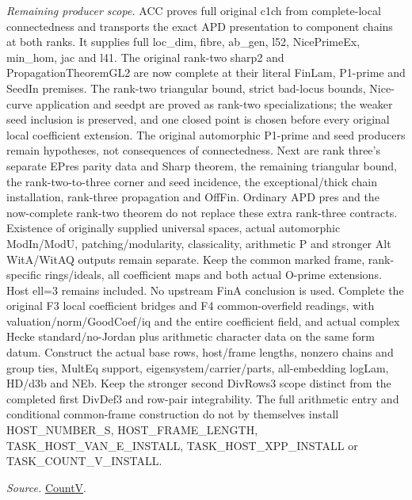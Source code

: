 \documentclass[11pt,a4paper]{article}
\numberwithin{equation}{section}
\theoremstyle{remark}\newtheorem{remark}[theorem]{Remark}
\begin{document}
\emph{Remaining producer scope.} ACC proves full original c1ch from complete-local connectedness and transports the exact APD presentation to component chains at both ranks. It supplies full loc\_\allowbreak dim, fibre, ab\_\allowbreak gen, l52, NicePrimeEx, min\_\allowbreak hom, jac and l41. The original rank-two sharp2 and PropagationTheoremGL2 are now complete at their literal FinLam, P1-prime and SeedIn premises. The rank-two triangular bound, strict bad-locus bounds, Nice-curve application and seedpt are proved as rank-two specializations; the weaker seed inclusion is preserved, and one closed point is chosen before every original local coefficient extension. The original automorphic P1-prime and seed producers remain hypotheses, not consequences of connectedness. Next are rank three's separate EPres parity data and Sharp theorem, the remaining triangular bound, the rank-two-to-three corner and seed incidence, the exceptional/thick chain installation, rank-three propagation and OffFin. Ordinary APD pres and the now-complete rank-two theorem do not replace these extra rank-three contracts. Existence of originally supplied universal spaces, actual automorphic ModIn/ModU, patching/modularity, classicality, arithmetic P and stronger Alt WitA/WitAQ outputs remain separate. Keep the common marked frame, rank-specific rings/ideals, all coefficient maps and both actual O-prime extensions. Host ell=3 remains included. No upstream FinA conclusion is used. Complete the original F3 local coefficient bridges and F4 common-overfield readings, with valuation/norm/GoodCoef/iq and the entire coefficient field, and actual complex Hecke standard/no-Jordan plus arithmetic character data on the same form datum. Construct the actual base rows, host/frame lengths, nonzero chains and group ties, MultEq support, eigensystem/carrier/parts, all-embedding logLam, HD/d3b and NEb. Keep the stronger second DivRows3 scope distinct from the completed first DivDef3 and row-pair integrability. The full arithmetic entry and conditional common-frame construction do not by themselves install HOST\_\allowbreak NUMBER\_\allowbreak S, HOST\_\allowbreak FRAME\_\allowbreak LENGTH, TASK\_\allowbreak HOST\_\allowbreak VAN\_\allowbreak E\_\allowbreak INSTALL, TASK\_\allowbreak HOST\_\allowbreak XPP\_\allowbreak INSTALL or TASK\_\allowbreak COUNT\_\allowbreak V\_\allowbreak INSTALL.

\emph{Source.} \href{https://github.com/CocoSgt/riemann-hypothesis-lean/blob/7cbf7a0c32fca1badf05931879a37c3f8a2b03b4/src/Development/AutomorphicArithmetic/AutomorphicVarieties/HeightAndVanishing/Counts.lean#L69-L69}{CountV}.
\end{document}
